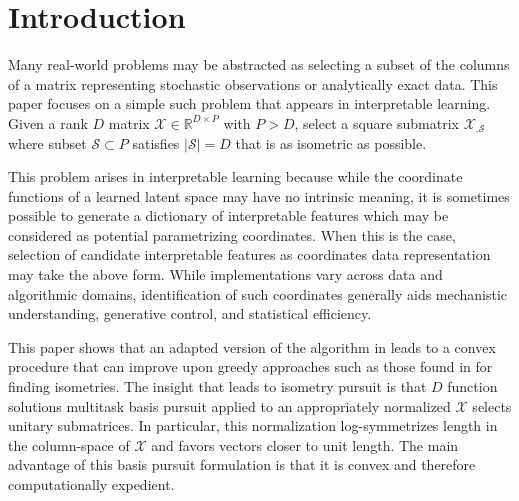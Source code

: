 \section{Introduction}
\label{sec:introduction}

Many real-world problems may be abstracted as selecting a subset of the columns of a matrix representing stochastic observations or analytically exact data.
This paper focuses on a simple such problem that appears in interpretable learning.
Given a rank $D$ matrix $\mathcal X \in \mathbb R^{D \times P}$ with $P > D$, select a square submatrix $\mathcal X_{.\mathcal S}$ where subset $\mathcal S \subset P$ satisfies $|\mathcal S| = D$ that is as isometric as possible.

This problem arises in interpretable learning because while the coordinate functions of a learned latent space may have no intrinsic meaning, it is sometimes possible to generate a dictionary of interpretable features which may be considered as potential parametrizing coordinates.
When this is the case, selection of candidate interpretable features as coordinates data representation may take the above form.
While implementations vary across data and algorithmic domains, identification of such coordinates generally aids mechanistic understanding, generative control, and statistical efficiency.

This paper shows that an adapted version of the algorithm in \citet{Koelle2024-no} leads to a convex procedure that can improve upon greedy approaches such as those found in \citet{NEURIPS2019_6a10bbd4, Kohli2021-lr, Jones2007-uc} for finding isometries.
The insight that leads to isometry pursuit is that $D$ function solutions multitask basis pursuit applied to an appropriately normalized $\mathcal X$ selects unitary submatrices.
In particular, this normalization log-symmetrizes length in the column-space of $\mathcal X$ and favors vectors closer to unit length.
The main advantage of this basis pursuit formulation is that it is convex and therefore computationally expedient.